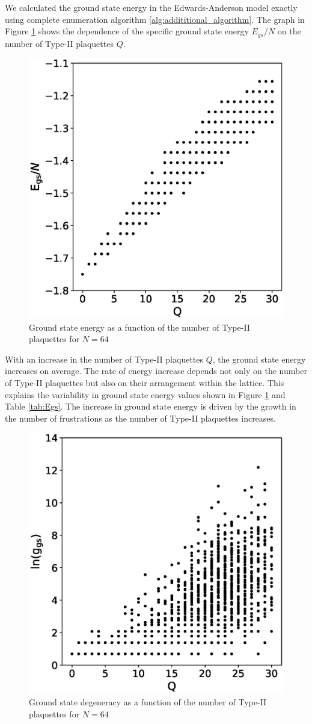 \documentclass[utf8, babel, sor, jor, amsmath, amssymb, reprint]{elsarticle} %
\begin{document}
We calculated the ground state energy in the Edwards-Anderson model exactly using complete enumeration algorithm \ref{alg:addititional_algorithm}. The graph in Figure \ref{fig:E(Q)} shows the dependence of the specific ground state energy $E_{gs}/N$ on the number of Type-II plaquettes $Q$.

\begin{figure}[H]
	\centering
		\includegraphics[width=0.5\linewidth]{pictures/E_Q.eps}
	\caption{Ground state energy as a function of the number of Type-II plaquettes for $N=64$}
	\label{fig:E(Q)}
\end{figure}

With an increase in the number of Type-II plaquettes $Q$, the ground state energy increases on average. The rate of energy increase depends not only on the number of Type-II plaquettes but also on their arrangement within the lattice. This explains the variability in ground state energy values shown in Figure \ref{fig:E(Q)} and Table \ref{tab:Egs}.
The increase in ground state energy is driven by the growth in the number of frustrations as the number of Type-II plaquettes increases.


\begin{figure}[H]
	\centering
	\includegraphics[width=0.5\linewidth]{pictures/g_Q.eps}
	\caption{Ground state degeneracy as a function of the number of Type-II plaquettes for $N=64$}
	\label{fig:g(Q)}
\end{figure}
\end{document}

